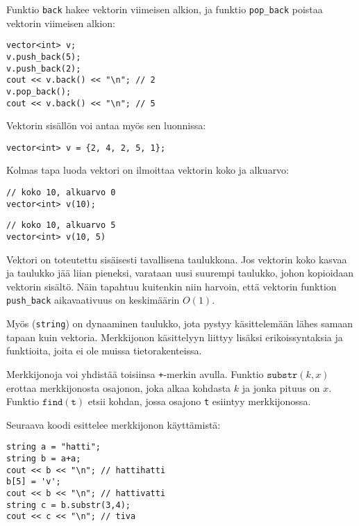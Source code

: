 Funktio \texttt{back} hakee vektorin viimeisen alkion,
ja funktio \texttt{pop\_back} poistaa vektorin
viimeisen alkion:

\begin{lstlisting}
vector<int> v;
v.push_back(5);
v.push_back(2);
cout << v.back() << "\n"; // 2
v.pop_back();
cout << v.back() << "\n"; // 5
\end{lstlisting}

Vektorin sisällön voi antaa myös sen luonnissa:

\begin{lstlisting}
vector<int> v = {2, 4, 2, 5, 1};
\end{lstlisting}

Kolmas tapa luoda vektori on ilmoittaa
vektorin koko ja alkuarvo:

\begin{lstlisting}
// koko 10, alkuarvo 0
vector<int> v(10);
\end{lstlisting}
\begin{lstlisting}
// koko 10, alkuarvo 5
vector<int> v(10, 5)
\end{lstlisting}

Vektori on toteutettu sisäisesti tavallisena taulukkona.
Jos vektorin koko kasvaa ja taulukko jää liian pieneksi,
varataan uusi suurempi taulukko, johon kopioidaan
vektorin sisältö.
Näin tapahtuu kuitenkin niin harvoin, että vektorin
funktion \texttt{push\_back} aikavaativuus on
keskimäärin $O(1)$.


Myös  (\texttt{string}) on dynaaminen taulukko,
jota pystyy käsittelemään lähes samaan
tapaan kuin vektoria.
Merkkijonon käsittelyyn liittyy lisäksi erikoissyntaksia
ja funktioita, joita ei ole muissa tietorakenteissa.

Merkkijonoja voi yhdistää toisiinsa \texttt{+}-merkin avulla.
Funktio $\texttt{substr}(k,x)$ erottaa merkkijonosta
osajonon, joka alkaa kohdasta $k$ ja jonka pituus on $x$.
Funktio $\texttt{find}(\texttt{t})$ etsii kohdan,
jossa osajono \texttt{t} esiintyy merkkijonossa.

Seuraava koodi esittelee merkkijonon käyttämistä:

\begin{lstlisting}
string a = "hatti";
string b = a+a;
cout << b << "\n"; // hattihatti
b[5] = 'v';
cout << b << "\n"; // hattivatti
string c = b.substr(3,4);
cout << c << "\n"; // tiva
\end{lstlisting}

